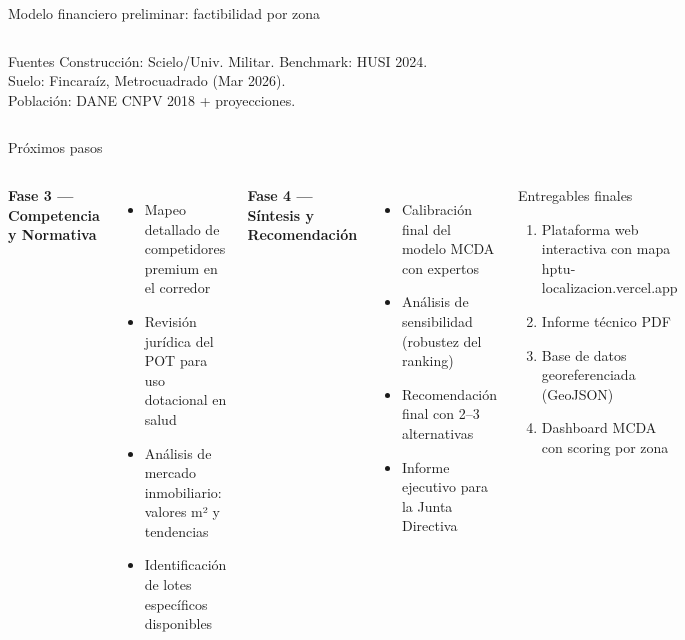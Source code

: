 \documentclass[aspectratio=169, 11pt]{beamer}
\begin{document}
\begin{frame}{Modelo financiero preliminar: factibilidad por zona}
\begin{columns}[T]
\begin{block}{\small Fuentes}
\tiny
Construcción: Scielo/Univ. Militar. Benchmark: HUSI 2024.\\
Suelo: Fincaraíz, Metrocuadrado (Mar 2026).\\
Población: DANE CNPV 2018 + proyecciones.
\end{block}
\end{columns}

\end{frame}

\begin{frame}{Próximos pasos}

\begin{columns}[T]
\textbf{Fase 3 — Competencia y Normativa}
\begin{itemize}\small
  \item Mapeo detallado de competidores premium en el corredor
  \item Revisión jurídica del POT para uso dotacional en salud
  \item Análisis de mercado inmobiliario: valores m² y tendencias
  \item Identificación de lotes específicos disponibles
\end{itemize}

\vspace{10pt}
\textbf{Fase 4 — Síntesis y Recomendación}
\begin{itemize}\small
  \item Calibración final del modelo MCDA con expertos
  \item Análisis de sensibilidad (robustez del ranking)
  \item Recomendación final con 2--3 alternativas
  \item Informe ejecutivo para la Junta Directiva
\end{itemize}

\begin{block}{\small Entregables finales}
\small
\begin{enumerate}\small
  \item Plataforma web interactiva con mapa\\
        {\tiny hptu-localizacion.vercel.app}
  \item Informe técnico PDF
  \item Base de datos georeferenciada (GeoJSON)
  \item Dashboard MCDA con scoring por zona
\end{enumerate}
\end{block}


\end{columns}
\end{frame}
\end{document}
